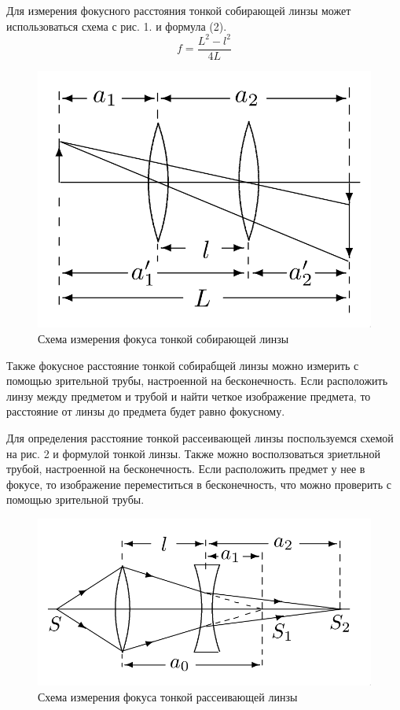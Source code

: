 \documentclass{astroedu-lab}
\begin{document}
\begin{problem}
\noindent
Для измерения фокусного расстояния тонкой собирающей линзы может использоваться схема с рис. 1. и формула (2).
\begin{equation}
    f = \frac{L^2 - l^2}{4L}
\end{equation}

\begin{figure}[H]
    \centering
    \includegraphics[scale=0.3]{pic_1.png}
    \caption{Схема измерения фокуса тонкой собирающей линзы}
\end{figure}

\noindent
Также фокусное расстояние тонкой собирабщей линзы можно измерить с помощью зрительной трубы, настроенной на бесконечность. Если расположить линзу между предметом и трубой и найти четкое изображение предмета, то расстояние от линзы до предмета будет равно фокусному.

\noindent
Для определения расстояние тонкой рассеивающей линзы поспользуемся схемой на рис. 2 и формулой тонкой линзы. Также можно восползоваться зриетльной трубой, настроенной на бесконечность. Если расположить предмет у нее в фокусе, то изображение переместиться в бесконечность, что можно проверить с помощью зрительной трубы.

\begin{figure}[H]
    \centering
    \includegraphics[scale=0.35]{pic_2.png}
    \caption{Схема измерения фокуса тонкой рассеивающей линзы}
\end{figure}


\end{problem}
\end{document}
